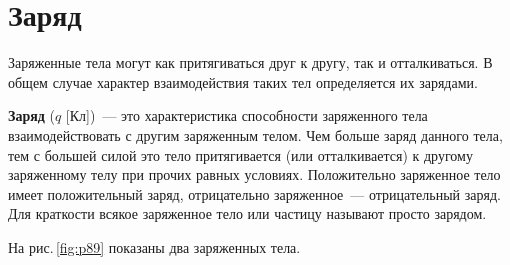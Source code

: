 \documentclass[main.tex]{subfiles}
\begin{document}

 

 

 
   

\section{Заряд}


Заряженные тела могут как притягиваться друг к другу, так и отталкиваться. В общем случае характер взаимодействия таких тел определяется их зарядами.

\textbf{Заряд} ($q$ [Кл])~--- это характеристика способности заряженного тела взаимодействовать с другим заряженным телом. Чем больше заряд данного тела, тем с большей силой это тело притягивается (или отталкивается) к другому заряженному телу при прочих равных условиях. Положительно заряженное тело имеет положительный заряд, отрицательно заряженное~--- отрицательный заряд. Для краткости всякое заряженное тело или частицу называют просто зарядом.

На рис.\,\ref{fig:p89} показаны два заряженных тела.
\end{document}
